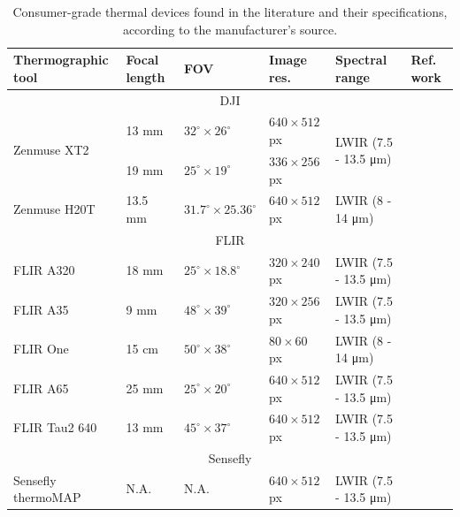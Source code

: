 \renewcommand{\arraystretch}{1.2}
\begin{table}[h!]
    \caption{Consumer-grade thermal devices found in the literature and their specifications, according to the manufacturer's source.}
    \label{table:thermographic_devices}
    \begin{tabular}{llllll}
        \toprule
        Thermographic tool & Focal length & FOV & Image res. & Spectral range & Ref. work \\
        \midrule
        \multicolumn{6}{c}{DJI}\\
        \multirow{2}{*}{Zenmuse XT2}    & 13 \si{\milli\meter}   & $32^{\circ} \times 26^{\circ}$  & $640 \times 512$ px  & \multirow{2}{*}{LWIR (7.5 - 13.5 \si{\micro\meter})}    & \multirow{2}{*}{\cite{lopez_optimized_2021, yuan_uav-based_2021, jo_dense_2021}}\\
        & 19 \si{\milli\meter}   & $25^{\circ} \times 19^{\circ}$  & $336 \times 256$ px  &   & \\
        Zenmuse H20T     & 13.5 \si{\milli\meter}   & $31.7^{\circ} \times 25.36^{\circ}$  & $640 \times 512$ px  & LWIR (8 - 14 \si{\micro\meter})    & \cite{paziewska_integration_2022, jiang_diurnal_2022}\\
        \cmidrule{1-6}
        \multicolumn{6}{c}{FLIR}\\
        FLIR A320     & 18 \si{\milli\meter}   & $25^{\circ} \times 18.8^{\circ}$  & $320 \times 240$ px  & LWIR (7.5 - 13.5 \si{\micro\meter})    & \cite{guilbert_fusion_2020}\\
        FLIR A35     & 9 \si{\milli\meter}   & $48^{\circ} \times 39^{\circ}$  & $320 \times 256$ px  & LWIR (7.5 - 13.5 \si{\micro\meter})    & \cite{comba_2d_2019}\\
        FLIR One     & 15 \si{\centi\meter}   & $50^{\circ} \times 38^{\circ}$  & $80 \times 60$ px  & LWIR (8 - 14 \si{\micro\meter})    & \cite{javadnejad_photogrammetric_2020}\\
        FLIR A65     & 25 \si{\milli\meter}   & $25^{\circ} \times 20^{\circ}$  & $640 \times 512$ px  & LWIR (7.5 - 13.5 \si{\micro\meter})    & \cite{adan_fusion_2017, jarzabek-rychard_supervised_2020, lin_fusion_2019, westfeld_generation_2015}\\
        FLIR Tau2 640     & 13 \si{\milli\meter}   & $45^{\circ} \times 37^{\circ}$  & $640 \times 512$ px  & LWIR (7.5 - 13.5 \si{\micro\meter})    & \cite{boesch_thermal_2017, sledz_thermal_2018}\\
        \cmidrule{1-6}
        \multicolumn{6}{c}{Sensefly}\\
        Sensefly thermoMAP     & N.A.   & N.A.  & $640 \times 512$ px  & LWIR (7.5 - 13.5 \si{\micro\meter})    & \cite{padua_vineyard_2019}\\
        \bottomrule
    \end{tabular}
\end{table}
\renewcommand{\arraystretch}{1}

